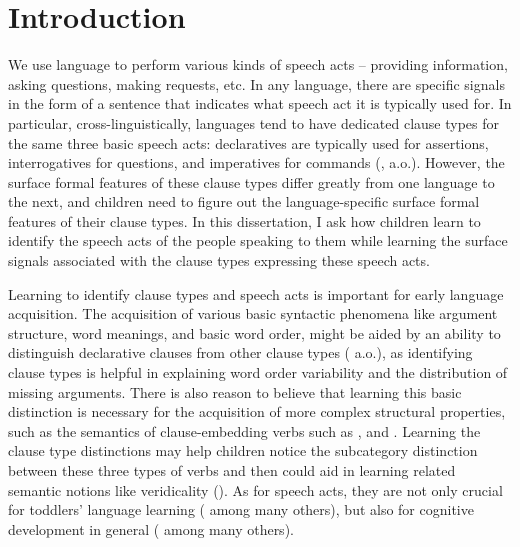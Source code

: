 \chapter{Introduction}
\label{chap:introduction}

We use language to perform various kinds of speech acts -- providing information, asking questions, making requests, etc. In any language, there are specific signals in the form of a sentence that indicates what speech act it is typically used for. In particular, cross-linguistically, languages tend to have dedicated clause types for the same three basic speech acts: declaratives are typically used for assertions, interrogatives for questions, and imperatives for commands (\citealt{sz1985speechact, konig2007, aikhenvald2016, portner2018}, a.o.). However, the surface formal features of these clause types differ greatly from one language to the next, and children need to figure out the language-specific surface formal features of their clause types. In this dissertation, I ask how children learn to identify the speech acts of the people speaking to them while learning the surface signals associated with the clause types expressing these speech acts. 


Learning to identify clause types and speech acts is important for early language acquisition. The acquisition of various basic syntactic phenomena like argument structure, word meanings, and basic word order, might be aided by an ability to distinguish declarative clauses from other clause types (\citealt{pinker1984, pinker1989, gleitman1990, frankgoldwaterfrank2013, perkins2019} a.o.), as identifying clause types is helpful in explaining word order variability and the distribution of missing arguments. There is also reason to believe that learning this basic distinction is necessary for the acquisition of more complex structural properties, such as the semantics of clause-embedding verbs such as ,  and . Learning the clause type distinctions may help children notice the subcategory distinction between these three types of verbs and then could aid in learning related semantic notions like veridicality (\citealt{white2015diss, lewis2017think,dudley2017,hacquardlidz2018}). 
As for speech acts, they are not only crucial for toddlers' language learning (\citealt{ninio1980, hoff1985cds,yoder1994,rowland2003cdswh, valian2003cds, rowe2017wh, gaudreau2021question} among many others), but also for cognitive development in general (\citealt{hohmann1995educating} among many others). 

